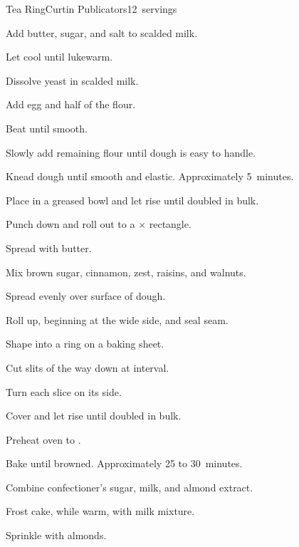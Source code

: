 \begin{recipe}{Tea Ring\FIXME}{Curtin Publicators}{12~servings}
\begin{directions}
\item Add  butter, sugar, and salt to scalded milk.
\item Let cool until lukewarm.
\item Dissolve yeast in scalded milk.
\item Add egg and half of the flour.
\item Beat until smooth.
\item Slowly add remaining flour until dough is easy to handle.
\item Knead dough until smooth and elastic. Approximately 5~minutes.
\item Place in a greased bowl and let rise until doubled in bulk.
\item Punch down and roll out to a $\times$ rectangle.
\item Spread with butter.
\item Mix brown sugar, cinnamon, zest, raisins, and walnuts.
\item Spread evenly over surface of dough.
\item Roll up, beginning at the wide side, and seal seam.
\item Shape into a ring on a baking sheet.
\item Cut slits \twothird{} of the way down at  interval.
\item Turn each slice on its side.
\item Cover and let rise until doubled in bulk.
\item Preheat oven to .
\item Bake until browned. Approximately 25 to 30~minutes.
\item Combine confectioner's sugar, milk, and almond extract.
\item Frost cake, while warm, with milk mixture.
\item Sprinkle with almonds.
\end{directions}

\end{recipe}
